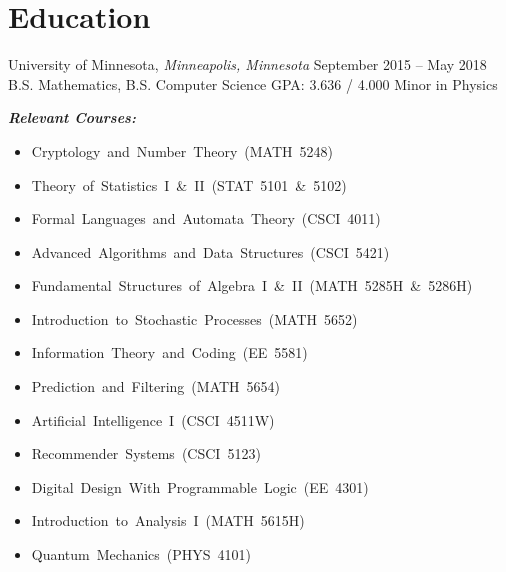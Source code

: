 \section{Education}
\block
  {University of Minnesota, {\normalfont \it Minneapolis, Minnesota}}
  {September 2015 -- May 2018}
  {B.S. Mathematics, B.S. Computer Science}
  {GPA: 3.636 / 4.000}
  {Minor in Physics}
  {}

{
  \descriptionsize
  \setlength{\columnsep}{65pt}
  \textbf{\emph{Relevant Courses:}}
  \begin{multicols}{2}
    \begin{itemize}
      \item \mbox{Cryptology and Number Theory (MATH 5248)}
      \item \mbox{Theory of Statistics I \& II (STAT 5101 \& 5102)}
      \item \mbox{Formal Languages and Automata Theory (CSCI 4011)}
      \item \mbox{Advanced Algorithms and Data Structures (CSCI 5421)}
      \item \mbox{Fundamental Structures of Algebra I \& II (MATH 5285H \& 5286H)}
      \item \mbox{Introduction to Stochastic Processes (MATH 5652)}
      \item \mbox{Information Theory and Coding (EE 5581)}
      \item \mbox{Prediction and Filtering (MATH 5654)}
      \item \mbox{Artificial Intelligence I (CSCI 4511W)}
      \item \mbox{Recommender Systems (CSCI 5123)}
      \item \mbox{Digital Design With Programmable Logic (EE 4301)}
      \item \mbox{Introduction to Analysis I (MATH 5615H)}
      \item \mbox{Quantum Mechanics (PHYS 4101)}
    \end{itemize}
  \end{multicols}
}
